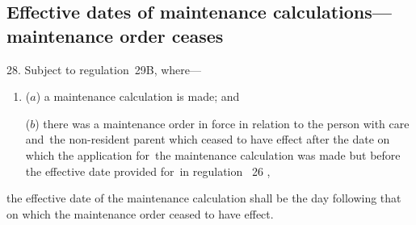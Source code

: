 \documentclass[12pt,a4paper]{article}
\begin{document}
%
%
%
%
%

\subsection[28. Effective dates of maintenance calculations—maintenance order ceases]{\sloppy Effective dates of maintenance calculations—\hspace{0pt}maintenance order ceases}

28.  
Subject to regulation~29B,  %
where—
\begin{enumerate}\item[]
($a$) a maintenance calculation is made; and

($b$) there was a maintenance order in force in relation to the person with care and~the non-resident parent which ceased to have effect after the date on which the application for~the maintenance calculation was made but before the effective date provided for~in regulation~%
26%
,
\end{enumerate}
the effective date of the maintenance calculation shall be the day following that on which the maintenance order ceased to have effect.
\end{document}
